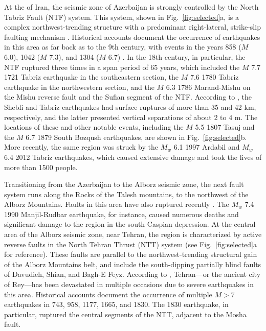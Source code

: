 At the  of Iran, the seismic zone of Azerbaijan is strongly controlled by the North Tabriz Fault (NTF) system. This system, shown in Fig.~\ref{fig:selected}a, is a complex northwest-trending structure with a predominant right-lateral, strike-slip faulting mechanism \citep{Berberian1999}. Historical accounts document the occurrence of earthquakes in this area as far back as to the 9th century, with events in the years 858 ($M$ 6.0), 1042 ($M$ 7.3), and 1304 ($M$ 6.7) \citep{Berberian1999}. In the 18th century, in particular, the NTF ruptured three times in a span period of 65 years, which included the $M$ 7.7 1721 Tabriz earthquake in the southeastern section, the $M$ 7.6 1780 Tabriz earthquake in the northwestern section, and the $M$ 6.3 1786 Marand-Mishu on the Mishu reverse fault and the Sufian segment of the NTF. According to \citet{Jones1834}, the  Shebli and Tabriz earthquakes had surface ruptures of more than 35 and 42 km, respectively, and the latter presented vertical separations of about 2 to 4 m. The locations of these and other notable events, including the $M$ 5.5 1807 Tasuj and the $M$ 6.7 1879 South Bozqush earthquakes, are shown in Fig.~\ref{fig:selected}b. More recently, the same region was struck by the $M_w$ 6.1 1997 Ardabil and $M_w$ 6.4 2012 Tabriz earthquakes, which caused extensive damage and took the lives of more than 1500 people.

Transitioning from the Azerbaijan to the Alborz seismic zone, the next fault system runs along the Rocks of the Talesh mountains, to the northwest of the Alborz Mountains. Faults in this area have also ruptured recently \citep{Berberian1999}. The $M_w$ 7.4 1990 Manjil-Rudbar earthquake, for instance, caused numerous deaths and significant damage to the region in the south Caspian depression. At the central area of the Alborz seismic zone, near Tehran, the region is characterized by active reverse faults in the North Tehran Thrust (NTT) system (see Fig.~\ref{fig:selected}a for reference). These faults are parallel to the northwest-trending structural gain of the Alborz Mountains belt, and include the south-dipping partially blind faults of Davudieh, Shian, and Bagh-E Feyz. According to \citet{Ambraseys_1982_Book}, Tehran---or the ancient city of Rey---has been devastated in multiple occasions due to severe earthquakes in this area. Historical accounts document the occurrence of multiple $M>7$ earthquakes in 743, 958, 1177, 1665, and 1830. The 1830 earthquake, in particular, ruptured the central segments of the NTT, adjacent to the Mosha fault.


